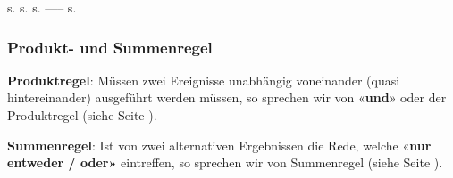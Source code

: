 {\hspace{18mm}
s. \pageref{kombiVariationMitZuruecklegen}\hspace{19mm}
s. \pageref{kombiVariationOhneWiederholung}\hspace{19mm}
s. \pageref{kombiVariationEinerTeilmenge}\hspace{17mm}
 ----- \hspace{30mm}
s. \pageref{kombiKombination}
}


\subsubsection{Produkt- und Summenregel}

\textbf{Produktregel}: Müssen zwei Ereignisse unabhängig voneinander
(quasi hintereinander) ausgeführt werden müssen, so sprechen wir von
«\textbf{und}» oder der Produktregel (siehe Seite \pageref{experimentePfadUndSummenregel}).

\textbf{Summenregel}: Ist von zwei alternativen Ergebnissen die Rede,
welche «\textbf{nur entweder / oder»} eintreffen, so sprechen wir von
Summenregel (siehe Seite \pageref{experimentePfadUndSummenregel}).


